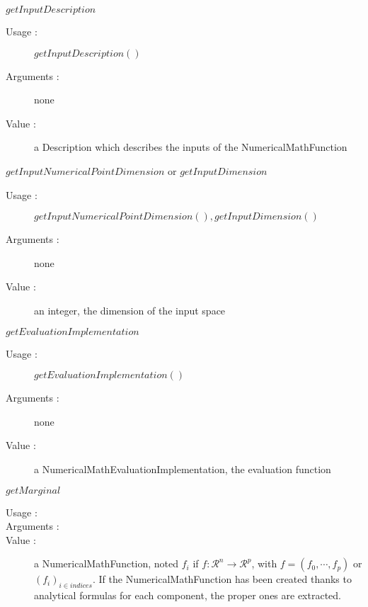 \begin{description}
\begin{description}
  \item $getInputDescription$
    \begin{description}
    \item[Usage :] $getInputDescription()$
    \item[Arguments :] none
    \item[Value :] a Description which describes the inputs of the NumericalMathFunction
    \end{description}
    \bigskip

  \item $getInputNumericalPointDimension$ or   $getInputDimension$
    \begin{description}
    \item[Usage :] $getInputNumericalPointDimension(), getInputDimension()$
    \item[Arguments :] none
    \item[Value :] an integer, the dimension of the input space
    \end{description}
    \bigskip

  \item $getEvaluationImplementation$
    \begin{description}
    \item[Usage :] $getEvaluationImplementation()$
    \item[Arguments :] none
    \item[Value :] a NumericalMathEvaluationImplementation, the evaluation function
    \end{description}
    \bigskip

  \item $getMarginal$
    \begin{description}
    \item[Usage :] \rule{0pt}{1em}
    \item[Arguments :] \rule{0pt}{1em}
    \item[Value :] a NumericalMathFunction, noted $f_i$ if $f : \mathcal{R}^n  \longrightarrow \mathcal{R}^p$, with $f = (f_0, \cdots, f_p)$ or $(f_i)_{i \in indices}$. If the NumericalMathFunction has been created thanks to  analytical formulas for each component, the proper ones are extracted.
    \end{description}
    \bigskip


\end{description}
\end{description}
